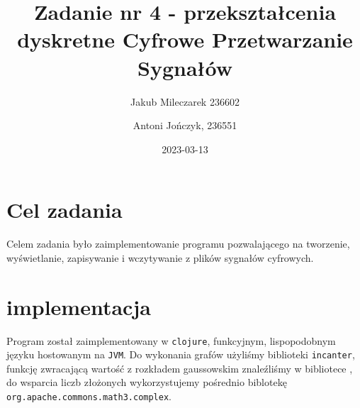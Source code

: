 \documentclass[12pt]{article}
\title{{\bf Zadanie nr 4 - przekształcenia dyskretne}\linebreak
	Cyfrowe Przetwarzanie Sygnałów}
\author{Jakub Mileczarek 236602 \and Antoni Jończyk, 236551}
\date{2023-03-13} %
\newcommand{\BibTeX}{{\sc Bib}\TeX}
\begin{document}
\clearpage\maketitle
\thispagestyle{empty}
\newpage
\setcounter{page}{1}
\section{Cel zadania}
Celem zadania było zaimplementowanie programu pozwalającego na tworzenie,
wyświetlanie, zapisywanie i wczytywanie z plików sygnałów cyfrowych.



\section{implementacja}
Program został zaimplementowany w \texttt{clojure}, funkcyjnym, lispopodobnym języku hostowanym na \texttt{JVM}. Do wykonania grafów użyliśmy biblioteki \texttt{incanter}{\cite{incanter}}, funkcję zwracającą wartość z rozkładem gaussowskim znaleźliśmy w bibliotece , do wsparcia liczb złożonych wykorzystujemy pośrednio biblotekę \texttt{org.apache.commons.math3.complex}.
\end{document}
